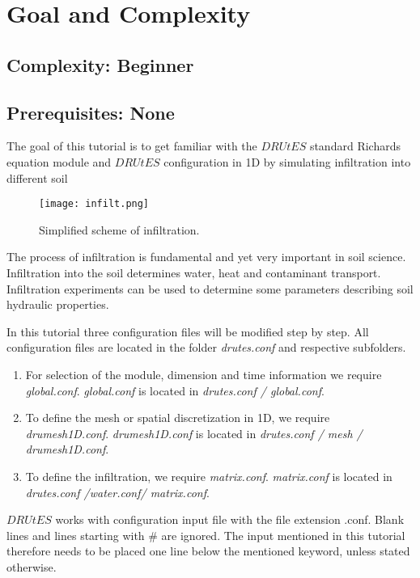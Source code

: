 \documentclass[
10pt, %
a4paper, %
oneside, %
headinclude,footinclude, %
BCOR5mm, %
]{scrartcl}
\begin{document}
\section{Goal and Complexity}
\subsection*{Complexity: Beginner}

\subsection*{Prerequisites: None}

The goal of this tutorial is to get familiar with the $DRUtES$ standard Richards equation module and $DRUtES$ configuration in 1D by simulating infiltration into different soil \medskip

\begin{figure}[!h]
\centering
\texttt{[image: infilt.png]}
\caption{Simplified scheme of infiltration.}
\end{figure}
The process of infiltration is fundamental and yet very important in soil science. Infiltration into the soil determines water, heat and contaminant transport. Infiltration experiments can be used to determine some parameters describing soil hydraulic properties. 

In this tutorial three configuration files will be modified step by step. All configuration files are located in the folder \emph{drutes.conf} and respective subfolders. \begin{enumerate}
\item For selection of the module, dimension and time information we require \emph{global.conf}.  \emph{global.conf} is located in \emph{drutes.conf / global.conf}. 
\item To define the mesh or spatial discretization in 1D,  we require \emph{drumesh1D.conf}. \emph{drumesh1D.conf} is located in \emph{drutes.conf / mesh / drumesh1D.conf}. 
\item To define the infiltration, we require \emph{matrix.conf}. \emph{matrix.conf} is located in \emph{drutes.conf /water.conf/ matrix.conf}. 
\end{enumerate}
$DRUtES$ works with configuration input file with the file extension .conf. Blank lines and lines starting with \# are ignored. The input mentioned in this tutorial therefore needs to be placed one line below the mentioned keyword, unless stated otherwise. 
\end{document}
